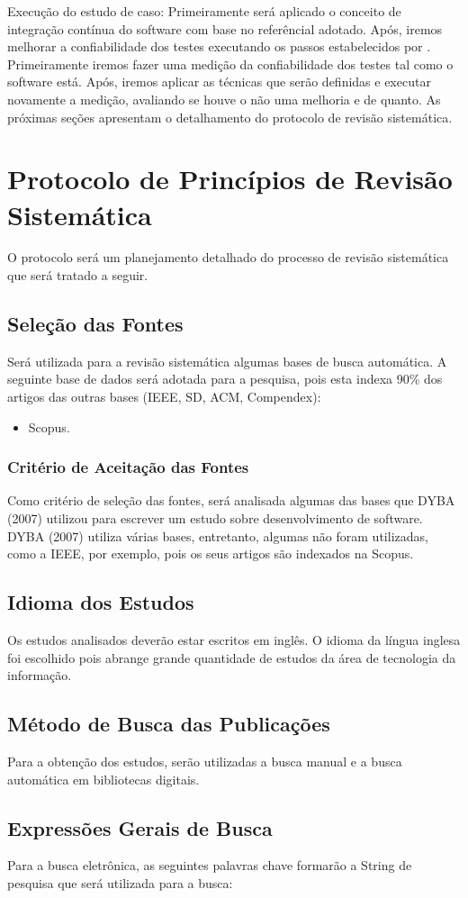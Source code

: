 Execução do estudo de caso: Primeiramente será aplicado o conceito de integração
contínua do software com base no referêncial adotado. Após, iremos melhorar a
confiabilidade dos testes executando os passos estabelecidos por \cite{e07}.
Primeiramente iremos fazer uma medição da confiabilidade dos testes tal como o
software está. Após, iremos aplicar as técnicas que serão definidas e executar
novamente a medição, avaliando se houve o não uma melhoria e de quanto.
As próximas seções apresentam o detalhamento do protocolo de revisão
sistemática.

\section{Protocolo de Princípios de Revisão Sistemática}
O protocolo será um planejamento detalhado do processo de revisão
sistemática que será tratado a seguir.
\subsection{Seleção das Fontes}
\label{sub:Seleção das Fontes}
Será utilizada para a revisão sistemática algumas bases de busca
automática. A seguinte base de dados será adotada para a pesquisa, pois
esta indexa 90\% dos artigos das outras bases (IEEE, SD, ACM, Compendex):

\begin{itemize}
    \item Scopus.
\end{itemize}

\subsubsection{Critério de Aceitação das Fontes}
\label{sub:Critério de Aceitação das Fontes}
Como critério de seleção das fontes, será analisada algumas das bases
que DYBA (2007) utilizou para escrever um estudo sobre desenvolvimento de
software. DYBA (2007) utiliza várias bases, entretanto, algumas não foram utilizadas,
como a IEEE, por exemplo, pois os seus artigos são indexados na Scopus.

\subsection{Idioma dos Estudos}
\label{sub:Idioma dos Estudos}
Os estudos analisados deverão estar escritos em inglês. O idioma da
língua inglesa foi escolhido pois abrange grande quantidade de estudos da área
de tecnologia da informação.

\subsection{Método de Busca das Publicações}
\label{sub:Método de Busca das Publicações}
Para a obtenção dos estudos, serão utilizadas a busca manual e a busca
automática em bibliotecas digitais.

\subsection{Expressões Gerais de Busca}
\label{sub:Expressões Gerais de Busca}
Para a busca eletrônica, as seguintes palavras chave formarão a String
de pesquisa que será utilizada para a busca:
